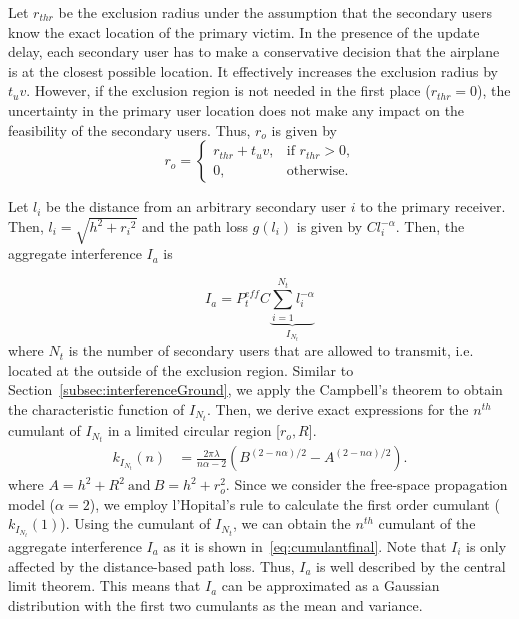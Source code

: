 \documentclass[12pt,submission,journal,onecolumn]{IEEEtran}
\begin{document}
Let $r_{thr}$ be the exclusion radius under the assumption that the secondary users know the exact location of the primary victim. In the presence of the update delay, each secondary user has to make a conservative decision that the airplane is at the closest possible location. It effectively increases the exclusion radius by $t_{u} v$. However, if the exclusion region is not needed in the first place ($r_{thr}=0$), the uncertainty in the primary user location does not make any impact on the feasibility of the secondary users. Thus, $r_o$ is given by
\begin{equation}\label{eq:AirborneRo}
   r_o= \left\{ \begin{array} {ll} r_{thr} + t_{u} v, &\mbox{if $r_{thr}>0$,}\\
0, &\mbox{otherwise.}
       \end{array} \right.
\end{equation}

Let $l_i$ be the distance from an arbitrary secondary user $i$ to the primary receiver. Then, $l_i = \sqrt{h^2+{r_i}^2}$ and the path loss $g(l_{i})$ is given by $C l_i^{-\alpha}$. Then, the aggregate interference $I_a$ is

\begin{equation} \label{eq:air_Ia}
I_a = P_{t}^{eff} C \underbrace{\sum^{N_t}_{i=1} l_{i}^{-\alpha}}_{I_{N_{t}}}
\end{equation}
where $N_t$ is the number of secondary users that are allowed to transmit, i.e. located at the outside of the exclusion region. Similar to Section~\ref{subsec:interferenceGround}, we apply the Campbell's theorem to obtain the characteristic function of $I_{N_{t}}$. Then, we derive exact expressions for the $n^{th}$ cumulant of $I_{N_{t}}$ in a limited circular region [$r_{o}, R$].
\begin{equation}
\label{eq:air_cumulant}
\begin{split}
k_{I_{N_{t}}} (n) & = \frac{2 \pi \lambda}{n\alpha - 2} (B^{(2-n\alpha)/2}-A^{(2-n\alpha)/2}).
\end{split}
\end{equation}
where $A=h^2+R^2 ~ \textrm{and} ~ B=h^2+r_o^2.$ Since we consider the free-space propagation model ($\alpha = 2$), we employ l'Hopital's rule to calculate the first order cumulant ($k_{I_{N_{t}}} (1)$).
Using the cumulant of $I_{N_{t}}$, we can obtain the $n^{th}$ cumulant of the aggregate interference $I_{a}$ as it is shown in~\eqref{eq:cumulantfinal}.
Note that $I_i$ is only affected by the distance-based path loss. Thus, $I_a$ is well described by the central limit theorem. This means that $I_a$ can be approximated as a Gaussian distribution with the first two cumulants as the mean and variance.
\end{document}
